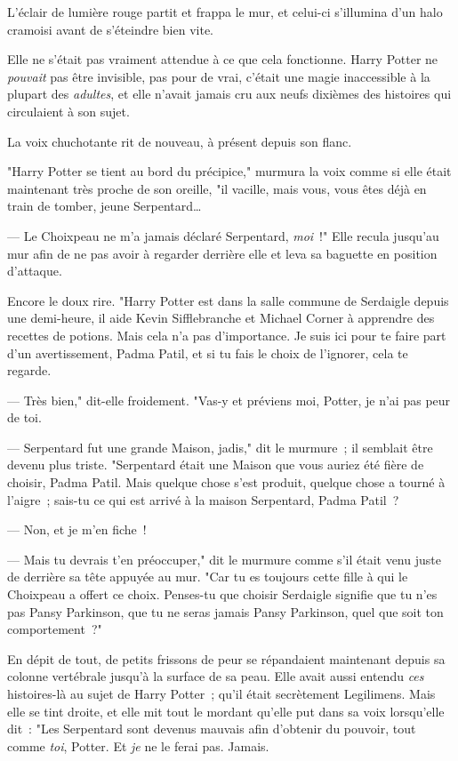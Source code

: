 L'éclair de lumière rouge partit et frappa le mur, et celui-ci s'illumina d'un halo cramoisi avant de s'éteindre bien vite.

Elle ne s'était pas vraiment attendue à ce que cela fonctionne. Harry Potter ne \emph{pouvait} pas être invisible, pas pour de vrai, c'était une magie inaccessible à la plupart des \emph{adultes}, et elle n'avait jamais cru aux neufs dixièmes des histoires qui circulaient à son sujet.

La voix chuchotante rit de nouveau, à présent depuis son flanc.

"Harry Potter se tient au bord du précipice," murmura la voix comme si elle était maintenant très proche de son oreille, "il vacille, mais vous, vous êtes déjà en train de tomber, jeune Serpentard…

--- Le Choixpeau ne m'a jamais déclaré Serpentard, \emph{moi}~!" Elle recula jusqu'au mur afin de ne pas avoir à regarder derrière elle et leva sa baguette en position d'attaque.

Encore le doux rire. "Harry Potter est dans la salle commune de Serdaigle depuis une demi-heure, il aide Kevin Sifflebranche et Michael Corner à apprendre des recettes de potions. Mais cela n'a pas d'importance. Je suis ici pour te faire part d'un avertissement, Padma Patil, et si tu fais le choix de l'ignorer, cela te regarde.

--- Très bien," dit-elle froidement. "Vas-y et préviens moi, Potter, je n'ai pas peur de toi.

--- Serpentard fut une grande Maison, jadis," dit le murmure~; il semblait être devenu plus triste. "Serpentard était une Maison que vous auriez été fière de choisir, Padma Patil. Mais quelque chose s'est produit, quelque chose a tourné à l'aigre~; sais-tu ce qui est arrivé à la maison Serpentard, Padma Patil~?

--- Non, et je m'en fiche~!

--- Mais tu devrais t'en préoccuper," dit le murmure comme s'il était venu juste de derrière sa tête appuyée au mur. "Car tu es toujours cette fille à qui le Choixpeau a offert ce choix. Penses-tu que choisir Serdaigle signifie que tu n'es pas Pansy Parkinson, que tu ne seras jamais Pansy Parkinson, quel que soit ton comportement~?"

En dépit de tout, de petits frissons de peur se répandaient maintenant depuis sa colonne vertébrale jusqu'à la surface de sa peau. Elle avait aussi entendu \emph{ces} histoires-là au sujet de Harry Potter~; qu'il était secrètement Legilimens. Mais elle se tint droite, et elle mit tout le mordant qu'elle put dans sa voix lorsqu'elle dit~: "Les Serpentard sont devenus mauvais afin d'obtenir du pouvoir, tout comme \emph{toi}, Potter. Et \emph{je} ne le ferai pas. Jamais.

